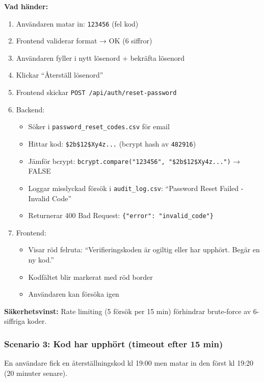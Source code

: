 \documentclass[12pt,a4paper]{article}
\begin{document}
\textbf{Vad händer:}
\begin{enumerate}[noitemsep]
  \item Användaren matar in: \texttt{123456} (fel kod)
  \item Frontend validerar format → OK (6 siffror)
  \item Användaren fyller i nytt lösenord + bekräfta lösenord
  \item Klickar ``Återställ lösenord''
  \item Frontend skickar \texttt{POST /api/auth/reset-password}
  \item Backend:
  \begin{itemize}[noitemsep]
    \item Söker i \texttt{password\_reset\_codes.csv} för email
    \item Hittar kod: \texttt{\$2b\$12\$Xy4z...} (bcrypt hash av \texttt{482916})
    \item Jämför bcrypt: \texttt{bcrypt.compare("123456", "\$2b\$12\$Xy4z...")} → FALSE
    \item Loggar misslyckad försök i \texttt{audit\_log.csv}: ``Password Reset Failed - Invalid Code''
    \item Returnerar 400 Bad Request: \texttt{\{"error": "invalid\_code"\}}
  \end{itemize}
  \item Frontend:
  \begin{itemize}[noitemsep]
    \item Visar röd felruta: ``Verifieringskoden är ogiltig eller har upphört. Begär en ny kod.''
    \item Kodfältet blir markerat med röd border
    \item Användaren kan försöka igen
  \end{itemize}
\end{enumerate}

\textbf{Säkerhetsvinst:} Rate limiting (5 försök per 15 min) förhindrar brute-force av 6-siffriga koder.

\subsubsection{Scenario 3: Kod har upphört (timeout efter 15 min)}

En användare fick en återställningskod kl 19:00 men matar in den först kl 19:20 (20 minuter senare).
\end{document}
